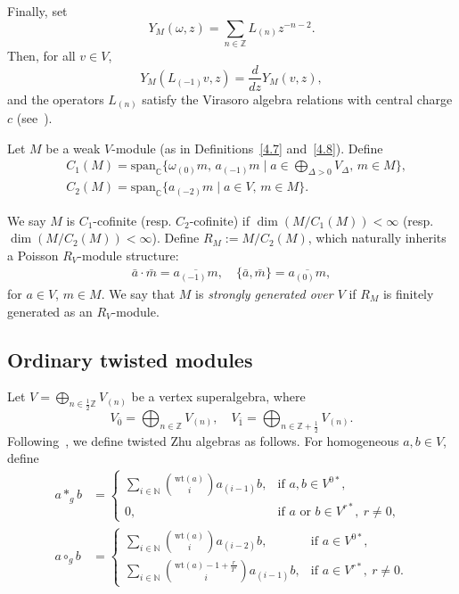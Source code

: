 \documentclass[9pt]{amsart}
\begin{document}
Finally, set
\[
Y_M(\omega, z) = \sum_{n \in \mathbb{Z}} L_{(n)} z^{-n-2}.
\]
Then, for all \( v \in V \),
\[
Y_M(L_{(-1)} v, z) = \frac{d}{dz} Y_M(v, z),
\]
and the operators \( L_{(n)} \) satisfy the Virasoro algebra relations with central charge \( c \) (see~\cite{dong1995regularity}).

Let $M$ be a weak $V$-module (as in Definitions~\ref{4.7} and~\ref{4.8}). Define
\begin{align}
&C_1(M) = \mathrm{span}_{\mathbb{C}} \{ \omega_{(0)} m,\, a_{(-1)} m \mid a \in \bigoplus_{\Delta>0} V_\Delta,\, m \in M \}, \\
&C_2(M) = \mathrm{span}_{\mathbb{C}} \{ a_{(-2)} m \mid a \in V,\, m \in M \}.
\end{align}

We say $M$ is $C_1$-cofinite (resp. $C_2$-cofinite) if $\dim(M / C_1(M)) < \infty$ (resp. $\dim(M / C_2(M)) < \infty$). Define $R_M := M / C_2(M)$, which naturally inherits a Poisson $R_V$-module structure:
\begin{align*}
\bar{a} \cdot \bar{m} = \overline{a_{(-1)} m}, \quad \{ \bar{a}, \bar{m} \} = \overline{a_{(0)} m},
\end{align*}
for $a \in V$, $m \in M$. We say that $M$ is \emph{strongly generated over $V$} if $R_M$ is finitely generated as an $R_V$-module.

\subsection{Ordinary twisted modules}

Let $V = \bigoplus_{n \in \frac{1}{2}\mathbb{Z}} V_{(n)}$ be a vertex superalgebra, where
\[
V_{\overline{0}} = \bigoplus_{n \in \mathbb{Z}} V_{(n)}, \quad V_{\overline{1}} = \bigoplus_{n \in \mathbb{Z} + \frac{1}{2}} V_{(n)}.
\]
Following~\cite{dong2006twisted}, we define twisted Zhu algebras as follows. For homogeneous $a, b \in V$, define
\begin{align}
\label{zhu1}
a *_g b &= 
\begin{cases}
\sum_{i \in \mathbb{N}} \binom{\mathrm{wt}(a)}{i} a_{(i-1)} b, & \text{if } a, b \in V^{0*}, \\
0, & \text{if } a \text{ or } b \in V^{r*},\ r \neq 0,
\end{cases} \\
\label{zhu2}
a \circ_g b &= 
\begin{cases}
\sum_{i \in \mathbb{N}} \binom{\mathrm{wt}(a)}{i} a_{(i-2)} b, & \text{if } a \in V^{0*}, \\
\sum_{i \in \mathbb{N}} \binom{\mathrm{wt}(a) - 1 + \frac{r}{T'}}{i} a_{(i-1)} b, & \text{if } a \in V^{r*},\ r \neq 0.
\end{cases}
\end{align}
\end{document}
